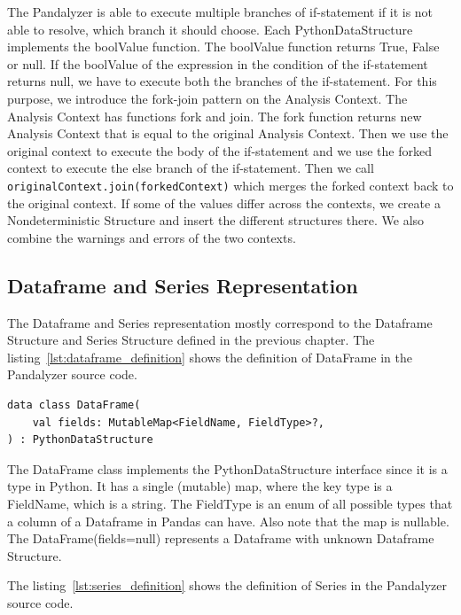 The Pandalyzer is able to execute multiple branches of if-statement if it is not able to resolve, which branch it should
choose.
Each PythonDataStructure implements the boolValue function.
The boolValue function returns True, False or null.
If the boolValue of the expression in the condition of the if-statement returns null, we have to execute both the
branches of the if-statement.
For this purpose, we introduce the fork-join pattern on the Analysis Context.
The Analysis Context has functions fork and join.
The fork function returns new Analysis Context that is equal to the original Analysis Context.
Then we use the original context to execute the body of the if-statement and we use the forked context to execute
the else branch of the if-statement.
Then we call \verb|originalContext.join(forkedContext)| which merges the forked context back to the original context.
If some of the values differ across the contexts, we create a Nondeterministic Structure and insert the different
structures there.
We also combine the warnings and errors of the two contexts.

\subsection{Dataframe and Series Representation}\label{subsec:dataframe-and-series-representation}

The Dataframe and Series representation mostly correspond to the Dataframe Structure and Series Structure defined in the
previous chapter.
The listing~\ref{lst:dataframe_definition} shows the definition of DataFrame in the Pandalyzer source code.

\begin{lstlisting}[caption=Kotlin definition of the Dataframe, label={lst:dataframe_definition}, captionpos=b]
data class DataFrame(
    val fields: MutableMap<FieldName, FieldType>?,
) : PythonDataStructure
\end{lstlisting}

The DataFrame class implements the PythonDataStructure interface since it is a type in Python.
It has a single (mutable) map, where the key type is a FieldName, which is a string.
The FieldType is an enum of all possible types that a column of a Dataframe in Pandas can have.
Also note that the map is nullable.
The DataFrame(fields=null) represents a Dataframe with unknown Dataframe Structure.

The listing~\ref{lst:series_definition} shows the definition of Series in the Pandalyzer source code.

